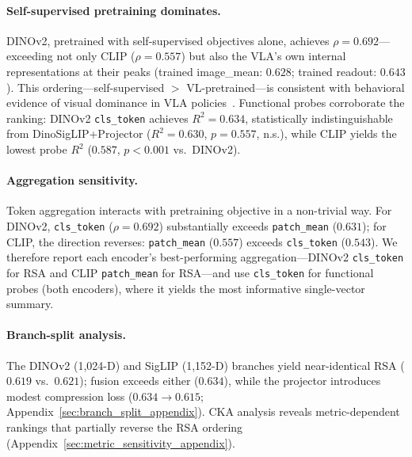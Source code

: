 \paragraph{Self-supervised pretraining dominates.}
DINOv2, pretrained with self-supervised objectives alone, achieves $\rho = 0.692$---exceeding not only CLIP ($\rho = 0.557$) but also the VLA's own internal representations at their peaks (trained image\_mean: $0.628$; trained readout: $0.643$).
This ordering---self-supervised $>$ VL-pretrained---is consistent with behavioral evidence of visual dominance in VLA policies~\cite{grant2026}.
Functional probes corroborate the ranking: DINOv2 \texttt{cls\_token} achieves $R^2 = 0.634$, statistically indistinguishable from DinoSigLIP+Projector ($R^2 = 0.630$, $p = 0.557$, n.s.), while CLIP yields the lowest probe $R^2$ ($0.587$, $p < 0.001$ vs.\ DINOv2).

\paragraph{Aggregation sensitivity.}
Token aggregation interacts with pretraining objective in a non-trivial way.
For DINOv2, \texttt{cls\_token} ($\rho = 0.692$) substantially exceeds \texttt{patch\_mean} ($0.631$); for CLIP, the direction reverses: \texttt{patch\_mean} ($0.557$) exceeds \texttt{cls\_token} ($0.543$).
We therefore report each encoder's best-performing aggregation---DINOv2 \texttt{cls\_token} for RSA and CLIP \texttt{patch\_mean} for RSA---and use \texttt{cls\_token} for functional probes (both encoders), where it yields the most informative single-vector summary.

\paragraph{Branch-split analysis.}
The DINOv2 (1{,}024-D) and SigLIP (1{,}152-D) branches yield near-identical RSA ($0.619$ vs.\ $0.621$); fusion exceeds either ($0.634$), while the projector introduces modest compression loss ($0.634 \to 0.615$; Appendix~\ref{sec:branch_split_appendix}).
CKA analysis reveals metric-dependent rankings that partially reverse the RSA ordering (Appendix~\ref{sec:metric_sensitivity_appendix}).

